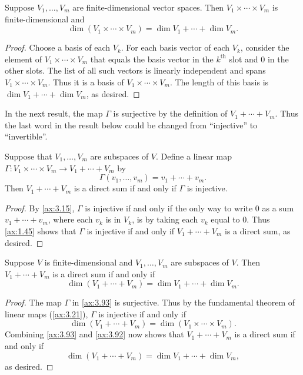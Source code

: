 \begin{result}\label{ax:3.92}
Suppose $V_1,\dots,V_m$ are finite-dimensional vector spaces. Then
$V_1\times\cdots\times V_m$ is finite-dimensional and
\[ \dim(V_1\times\cdots\times V_m) = \dim V_1+\cdots+\dim V_m. \]
\end{result}

\begin{proof}
Choose a basis of each $V_k$. For each basis vector of each $V_k$, consider the
element of $V_1\times\cdots\times V_m$ that equals the basis vector in the
$k^{\text{th}}$ slot and $0$ in the other slots. The list of all such vectors is
linearly independent and spans $V_1\times\cdots\times V_m$. Thus it is a basis
of $V_1\times\cdots\times V_m$. The length of this basis is
$\dim V_1+\cdots+\dim V_m$, as desired.
\end{proof}

In the next result, the map $\Gamma$ is surjective by the definition of
$V_1+\cdots+V_m$. Thus the last word in the result below could be changed from
``injective'' to ``invertible''.

\begin{result}\label{ax:3.93}
Suppose that $V_1,\dots,V_m$ are subspaces of $V$. Define a linear map
$\Gamma\colon V_1\times\cdots\times V_m\to V_1+\cdots+V_m$ by
\[ \Gamma(v_1,\dots,v_m) = v_1+\cdots+v_m. \]
Then $V_1+\cdots+V_m$ is a direct sum if and only if $\Gamma$ is injective.
\end{result}

\begin{proof}
By \ref{ax:3.15}, $\Gamma$ is injective if and only if the only way to write $0$
as a sum $v_1+\cdots+v_m$, where each $v_k$ is in $V_k$, is by taking each $v_k$
equal to $0$. Thus \ref{ax:1.45} shows that $\Gamma$ is injective if and only if
$V_1+\cdots+V_m$ is a direct sum, as desired.
\end{proof}

\begin{result}\label{ax:3.94}
Suppose $V$ is finite-dimensional and $V_1,\dots,V_m$ are subspaces of $V$. Then
$V_1+\cdots+V_m$ is a direct sum if and only if
\[ \dim(V_1+\cdots+V_m) = \dim V_1+\cdots+\dim V_m. \]
\end{result}

\begin{proof}
The map $\Gamma$ in \ref{ax:3.93} is surjective. Thus by the fundamental theorem
of linear maps (\ref{ax:3.21}), $\Gamma$ is injective if and only if
\[ \dim(V_1+\cdots+V_m) = \dim(V_1\times\cdots\times V_m). \]
Combining \ref{ax:3.93} and \ref{ax:3.92} now shows that $V_1+\cdots+V_m$ is a
direct sum if and only if
\[ \dim(V_1+\cdots+V_m) = \dim V_1+\cdots+\dim V_m, \]
as desired.
\end{proof}

